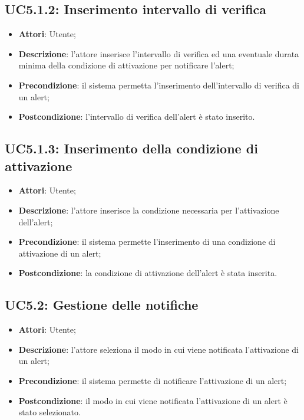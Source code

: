 \subsection{UC5.1.2: Inserimento intervallo di verifica}
\hypertarget{UC5.1.2}{}
\begin{itemize}
	\item \textbf{Attori}: Utente;
	\item \textbf{Descrizione}: l'attore inserisce l'intervallo di verifica ed una eventuale durata minima della condizione di attivazione per notificare l'alert;
	\item \textbf{Precondizione}: il sistema permetta l'inserimento dell'intervallo di verifica di un alert;
	\item \textbf{Postcondizione}: l'intervallo di verifica dell'alert è stato inserito.
\end{itemize}

\subsection{UC5.1.3: Inserimento della condizione di attivazione}
\hypertarget{UC5.1.3}{}
\begin{itemize}
	\item \textbf{Attori}: Utente;
	\item \textbf{Descrizione}: l'attore inserisce la condizione necessaria per l'attivazione dell'alert;
	\item \textbf{Precondizione}: il sistema permette l'inserimento di una condizione di attivazione di un alert;
	\item \textbf{Postcondizione}: la condizione di attivazione dell'alert è stata inserita.
\end{itemize}

\subsection{UC5.2: Gestione delle notifiche}
\hypertarget{UC5.2}{}
\begin{itemize}
	\item \textbf{Attori}: Utente;
	\item \textbf{Descrizione}: l'attore seleziona il modo in cui viene notificata l'attivazione di un alert;
	\item \textbf{Precondizione}: il sistema permette di notificare l'attivazione di un alert;
	\item \textbf{Postcondizione}: il modo in cui viene notificata l'attivazione di un alert è stato selezionato.
\end{itemize}
